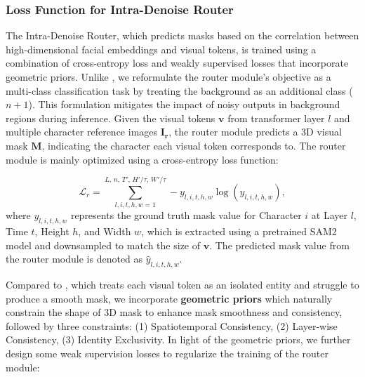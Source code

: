 \subsubsection{Loss Function for Intra-Denoise Router}
The Intra-Denoise Router, which predicts masks based on the correlation between high-dimensional facial embeddings and visual tokens, is trained using a combination of cross-entropy loss and weakly supervised losses that incorporate geometric priors.
Unlike \cite{fei_ingredients_2025}, we reformulate the router module's objective as a multi-class classification task by treating the background as an additional class ($n + 1$). This formulation mitigates the impact of noisy outputs in background regions during inference.
Given the visual tokens \( \mathbf{v} \) from transformer layer \( l \) and multiple character reference images \( \mathbf{I_r} \), the router module predicts a 3D visual mask \( \mathbf{M}\), indicating the character each visual token corresponds to. The router module is mainly optimized using a cross-entropy loss function:

\begin{equation}
\mathcal{L}_r = \sum_{l,i,t,h,w=1}^{L, \, n, \, T', \, H'/\tau, \, W'/\tau} -y_{l, i, t, h, w} \log(\hat{y}_{l, i, t, h, w}),
\end{equation}
where \( y_{l, i, t, h, w} \) represents the ground truth mask value for Character \( i \) at Layer \( l \), Time \( t \), Height \( h \), and Width \( w \), which is extracted using a pretrained SAM2 \cite{ravi2024sam2} model and downsampled to match the size of \( \mathbf{v} \). The predicted mask value from the router module is denoted as \( \hat{y}_{l, i, t, h, w} \).

Compared to \cite{fei_ingredients_2025}, which treats each visual token as an isolated entity and struggle to produce a smooth mask, we incorporate \textbf{geometric priors} which naturally constrain the shape of 3D mask to enhance mask smoothness and consistency, followed by three constraints: (1) Spatiotemporal Consistency, (2) Layer-wise Consistency, (3) Identity Exclusivity.
In light of the geometric priors, we further design some weak supervision losses to regularize the training of the router module:


